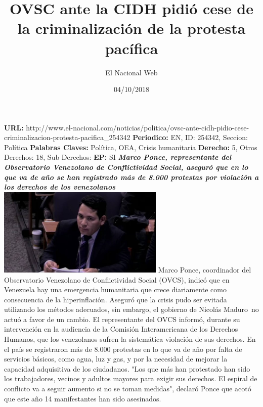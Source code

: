 \documentclass{article}%
\title{\textbf{OVSC ante la CIDH pidió cese de la criminalización de la protesta pacífica}}%
\author{El Nacional Web}%
\date{04/10/2018}%
\begin{document}
%
\normalsize%
\maketitle%
\textbf{URL: }%
http://www.el{-}nacional.com/noticias/politica/ovsc{-}ante{-}cidh{-}pidio{-}cese{-}criminalizacion{-}protesta{-}pacifica\_254342\newline%
%
\textbf{Periodico: }%
EN, %
ID: %
254342, %
Seccion: %
Política\newline%
%
\textbf{Palabras Claves: }%
Política, OEA, Crisis humanitaria\newline%
%
\textbf{Derecho: }%
5, %
Otros Derechos: %
18, %
Sub Derechos: %
\newline%
%
\textbf{EP: }%
SI\newline%
\newline%
%
\textbf{\textit{Marco Ponce, representante del Observatorio Venezolano de Conflictividad Social, aseguró que en lo que va de año se han registrado más de 8.000 protestas por violación a los derechos de los venezolanos}}%
\newline%
\newline%
%
\includegraphics[width=300px]{90.jpg}%
\newline%
%
Marco Ponce, coordinador del Observatorio Venezolano de Conflictividad Social (OVCS), indicó que en Venezuela hay una emergencia humanitaria que crece diariamente como consecuencia de la hiperinflación. Aseguró que la crisis pudo ser evitada utilizando los métodos adecuados, sin embargo, el gobierno de Nicolás Maduro~no actuó a favor de un cambio.%
\newline%
%
El representante del OVCS informó, durante su intervención en la audiencia de la Comisión Interamericana de los Derechos Humanos, que los venezolanos sufren la sistemática violación de sus derechos. En el país se registraron más de 8.000 protestas en lo que va de año por falta de servicios básicos, como agua, luz y gas, y por la necesidad de mejorar la capacidad adquisitiva de los ciudadanos.%
\newline%
%
"Los que más han protestado han sido los trabajadores, vecinos y adultos mayores para exigir sus derechos. El espiral de conflicto va a seguir aumento si no se toman medidas", declaró Ponce que acotó que este año 14 manifestantes han sido asesinados.%
\end{document}
